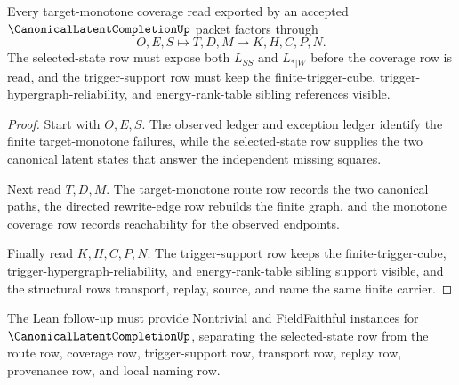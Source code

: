\begin{theorem}
\label{thm:canonical-latent-completion-selected-route-coverage}
Every target-monotone coverage read exported by an accepted $\CanonicalLatentCompletionUp$ packet factors through
$$
O,E,S \longmapsto T,D,M \longmapsto K,H,C,P,N .
$$
The selected-state row must expose both $L_{SS}$ and $L_{*|W}$ before the coverage row is read, and the trigger-support row must keep the finite-trigger-cube, trigger-hypergraph-reliability, and energy-rank-table sibling references visible.
\end{theorem}
\begin{proof}
Start with $O,E,S$. The observed ledger and exception ledger identify the finite target-monotone failures, while the selected-state row supplies the two canonical latent states that answer the independent missing squares.

Next read $T,D,M$. The target-monotone route row records the two canonical paths, the directed rewrite-edge row rebuilds the finite graph, and the monotone coverage row records reachability for the observed endpoints.

Finally read $K,H,C,P,N$. The trigger-support row keeps the finite-trigger-cube, trigger-hypergraph-reliability, and energy-rank-table sibling support visible, and the structural rows transport, replay, source, and name the same finite carrier.
\end{proof}



The Lean follow-up must provide Nontrivial and FieldFaithful instances for $\CanonicalLatentCompletionUp$, separating the selected-state row from the route row, coverage row, trigger-support row, transport row, replay row, provenance row, and local naming row.


